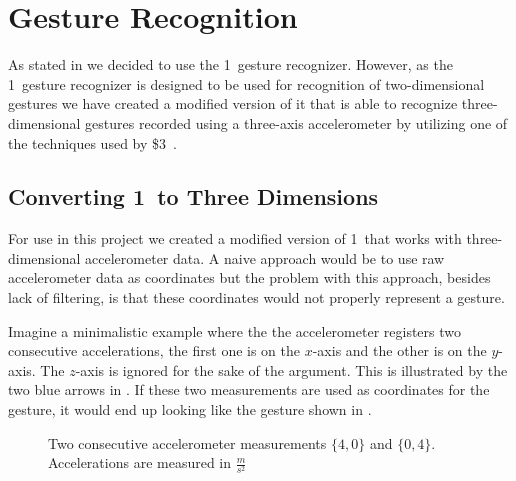 \section{Gesture Recognition}
\label{sec:design:gesture-recognition}

As stated in  we decided to use the 1\textcent~gesture recognizer.
However, as the 1\textcent~gesture recognizer is designed to be used for recognition of two-dimensional gestures we have created a modified version of it that is able to recognize three-dimensional gestures recorded using a three-axis accelerometer by utilizing one of the techniques used by \$3~\cite{threedollar}.

\subsection{Converting 1\textcent~to Three Dimensions}
For use in this project we created a modified version of 1\textcent~that works with three-dimensional accelerometer data.
A naive approach would be to use raw accelerometer data as coordinates but the problem with this approach, besides lack of filtering, is that these coordinates would not properly represent a gesture.

Imagine a minimalistic example where the the accelerometer registers two consecutive accelerations, the first one is on the $x$-axis and the other is on the $y$-axis.
The $z$-axis is ignored for the sake of the argument.
This is illustrated by the two blue arrows in .
If these two measurements are used as coordinates for the gesture, it would end up looking like the gesture shown in .

\begin{figure}[h]
\centering
\caption{Two consecutive accelerometer measurements $\{4,0\}$ and $\{0,4\}$. Accelerations are measured in $\frac{m}{s^2}$}
\label{fig:accelerometerpoints}
\end{figure}

